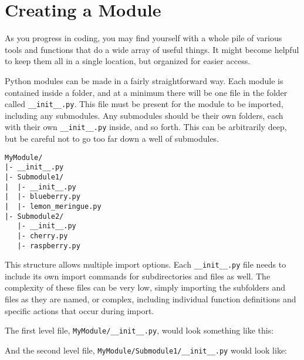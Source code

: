 \section{Creating a Module}
As you progress in coding, you may find yourself with a whole pile of
various tools and functions that do a wide array of useful things. It
might become helpful to keep them all in a single location, but
organized for easier access.

Python modules can be made in a fairly straightforward way. Each module
is contained inside a folder, and at a minimum there will be one file in
the folder called \texttt{\_\_init\_\_.py}. This file must be present
for the module to be imported, including any submodules. Any submodules
should be their own folders, each with their own
\texttt{\_\_init\_\_.py} inside, and so forth. This can be arbitrarily
deep, but be careful not to go too far down a well of submodules.

\begin{verbatim}
MyModule/
|- __init__.py
|- Submodule1/
|  |- __init__.py
|  |- blueberry.py
|  |- lemon_meringue.py
|- Submodule2/
   |- __init__.py
   |- cherry.py
   |- raspberry.py
\end{verbatim}

This structure allows multiple import options. Each
\texttt{\_\_init\_\_.py} file needs to include its own import commands
for subdirectories and files as well. The complexity of these files can
be very low, simply importing the subfolders and files as they are
named, or complex, including individual function definitions and
specific actions that occur during import.

The first level file, \texttt{MyModule/\_\_init\_\_.py}, would look
something like this:

\begin{Shaded}
\begin{Highlighting}[]
\end{Highlighting}
\end{Shaded}

And the second level file, \texttt{MyModule/Submodule1/\_\_init\_\_.py}
would look like:

\begin{Shaded}
\begin{Highlighting}[]
\end{Highlighting}
\end{Shaded}

